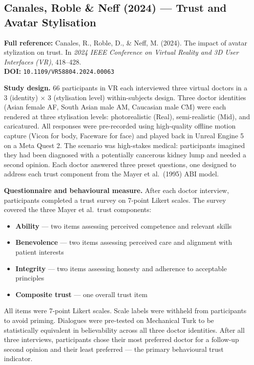 \documentclass[11pt, a4paper]{article}
\begin{document}
\vspace{8pt}
\subsection{Canales, Roble \& Neff (2024) --- Trust and Avatar Stylisation}

\begin{refbox}
\textbf{Full reference:} Canales, R., Roble, D., \& Neff, M. (2024). The impact of avatar stylization on trust. In \textit{2024 IEEE Conference on Virtual Reality and 3D User Interfaces (VR)}, 418--428.\\[4pt]
\textbf{DOI:} \texttt{10.1109/VR58804.2024.00063}
\end{refbox}

\textbf{Study design.} 66 participants in VR each interviewed three virtual doctors in a 3 (identity) $\times$ 3 (stylisation level) within-subjects design. Three doctor identities (Asian female AF, South Asian male AM, Caucasian male CM) were each rendered at three stylisation levels: photorealistic (Real), semi-realistic (Mid), and caricatured. All responses were pre-recorded using high-quality offline motion capture (Vicon for body, Faceware for face) and played back in Unreal Engine 5 on a Meta Quest 2. The scenario was high-stakes medical: participants imagined they had been diagnosed with a potentially cancerous kidney lump and needed a second opinion. Each doctor answered three preset questions, one designed to address each trust component from the Mayer et al.\ (1995) ABI model.

\textbf{Questionnaire and behavioural measure.} After each doctor interview, participants completed a trust survey on 7-point Likert scales. The survey covered the three Mayer et al.\ trust components:

\begin{itemize}[leftmargin=2em]
  \item \textbf{Ability} --- two items assessing perceived competence and relevant skills
  \item \textbf{Benevolence} --- two items assessing perceived care and alignment with patient interests
  \item \textbf{Integrity} --- two items assessing honesty and adherence to acceptable principles
  \item \textbf{Composite trust} --- one overall trust item
\end{itemize}

All items were 7-point Likert scales. Scale labels were withheld from participants to avoid priming. Dialogues were pre-tested on Mechanical Turk to be statistically equivalent in believability across all three doctor identities. After all three interviews, participants chose their most preferred doctor for a follow-up second opinion and their least preferred --- the primary behavioural trust indicator.
\end{document}
